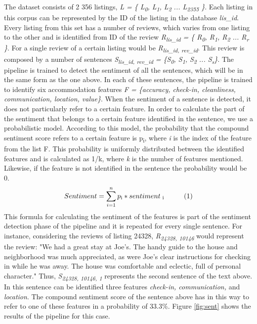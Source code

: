 The dataset consists of 2 356 listings, \textit{L = \{ L\textsubscript{0}, L\textsubscript{1},  L\textsubscript{2} ... L\textsubscript{2355} \}}. Each listing in this corpus can be represented by the ID of the listing in the database \textit{lis\_id}. Every listing from this set has a number of reviews, which varies from one listing to the other and is identified from ID of the review \textit{R\textsubscript{lis\_id} = \{ R\textsubscript{0}, R\textsubscript{1},  R\textsubscript{2} ... R\textsubscript{r} \}}. For a single review of a certain listing would be \textit{R\textsubscript{lis\_id, rev\_id}}. This review is composed by a number of sentences \textit{S\textsubscript{lis\_id, rev\_id} = \{S\textsubscript{0}, S\textsubscript{1}, S\textsubscript{2} ... S\textsubscript{s}\}}. 
The pipeline is trained to detect the sentiment of all the sentences, which will be in the same form as the one above. 
In each of these sentences, the pipeline is trained to identify six accommodation features \textit{F = \{accuracy, check-in, cleanliness, communication, location, value\}}. When the sentiment of a sentence is detected, it does not particularly refer to a certain feature. In order to calculate the part of the sentiment that belongs to a certain feature identified in the sentence, we use a probabilistic model. According to this model, the probability that the compound sentiment score refers to a certain feature is p\textsubscript{i}, where \textit{i} is the index of the feature from the list F. This probability is uniformly distributed between the identified features and is calculated as 1/k, where \textit{k} is the number of features mentioned. Likewise, if the feature is not identified in the sentence the probability would be 0.
%
$$Sentiment = \sum_{i=1}^{n}p\textsubscript{i} *  sentiment\textsubscript{ i} \hspace{1cm} (1)$$ 
%
This formula for calculating the sentiment of the features is part of the sentiment detection phase of the pipeline and it is repeated for every single sentence. For instance, considering the reviews of listing 24328,  \textit{R\textsubscript{24328, 10146}} would represent the review: "We had a great stay at Joe's. The handy guide to the house and neighborhood was much appreciated, as were Joe's clear instructions for checking in while he was away. The house was comfortable and eclectic, full of personal character." Thus, \textit{S\textsubscript{24328, 10146, 1}} represents the second sentence of the text above. In this sentence can be identified three features \textit{check-in, communication,} and \textit{location}. The compound sentiment score of the sentence above has in this way to refer to one of these features in a probability of 33.3\%. Figure \ref{fig:sent} shows the results of the pipeline for this case. 
